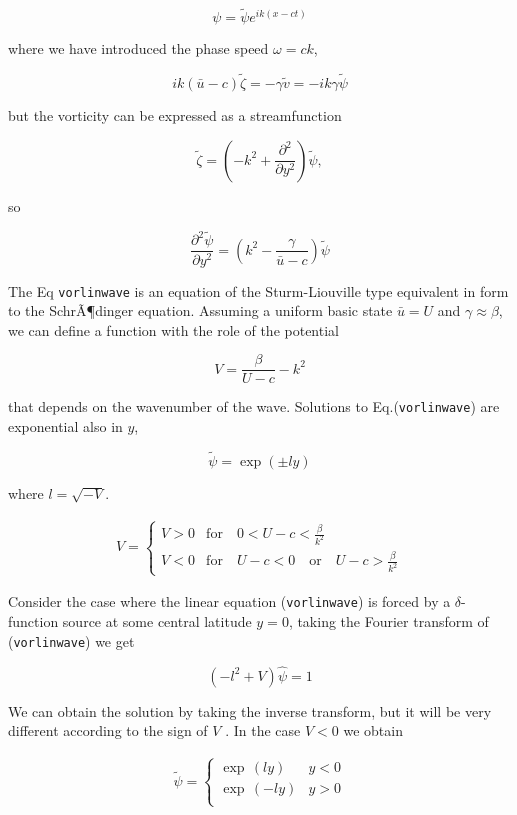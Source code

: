 \[\psi = \tilde{\psi}e^{ik(x-ct)}\]

where we have introduced the phase speed \(\omega = c k\),

\[i k (\bar{u}-c)\tilde{\zeta} = -\gamma \tilde{v} = -i k \gamma \tilde{\psi}\]

but the vorticity can be expressed as a streamfunction

\[\tilde{\zeta}=\left( -k^2 +\frac{\partial^{2} }{\partial y^{2}}\right)\tilde{\psi},\]

so

{\[\frac{\partial^{2} \tilde{\psi}}{\partial y^{2}} = \left( k^2 -\frac{\gamma}{\bar{u}-c}\right) \tilde{\psi}\]}

The Eq \texttt{vorlinwave} is an equation of the Sturm-Liouville type
equivalent in form to the SchrÃ¶dinger equation. Assuming a uniform
basic state \(\bar{u}=U\) and \(\gamma \approx \beta\), we can define a
function with the role of the potential

\[V = \frac{\beta}{U-c} -k^2\]

that depends on the wavenumber of the wave. Solutions to
Eq.(\texttt{vorlinwave}) are exponential also in \(y\),

{\[\tilde{\psi} = \exp{(\pm l y)}\]}

where \(l = \sqrt{- V}\).

\[\begin{aligned}
V= 
\begin{cases}
V > 0 & \text{for}\quad 0 < U-c< \frac{\beta}{k^2}\\
V<0 & \text{for} \quad U-c<0 \quad \text{or}\quad U-c >\frac{\beta}{k^2}
\end{cases}
\end{aligned}\]

Consider the case where the linear equation (\texttt{vorlinwave}) is
forced by a \(\delta\)-function source at some central latitude
\(y =0\), taking the Fourier transform of (\texttt{vorlinwave}) we get

\[(-l^2+V)\hat{\psi} = 1\]

We can obtain the solution by taking the inverse transform, but it will
be very different according to the sign of \(V\) . In the case \(V<0\)
we obtain

\[\begin{aligned}
\tilde{\psi} =
\begin{cases}
\exp\,(ly) & y<0\\
\exp\,(-ly) & y>0\\
\end{cases}
\end{aligned}\]

